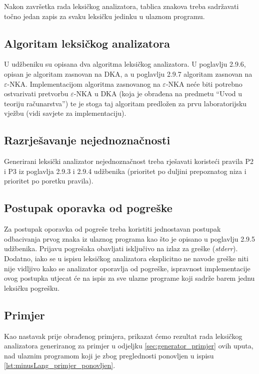 \documentclass[times, 12pt, utf8]{book}
\begin{document}
Nakon završetka rada leksičkog analizatora, tablica znakova treba sadržavati točno jedan zapis za svaku leksičku jedinku u ulaznom programu.

\subsection{Algoritam leksičkog analizatora}
U udžbeniku su opisana dva algoritma leksičkog analizatora.
U poglavlju 2.9.6, opisan je algoritam zasnovan na DKA, a u poglavlju 2.9.7 algoritam zasnovan na \(\varepsilon\)-NKA.
Implementacijom algoritma zasnovanog na \(\varepsilon\)-NKA neće biti potrebno ostvarivati pretvorbu \(\varepsilon\)-NKA u DKA (koja je obrađena na predmetu “Uvod u teoriju računarstva”) te je stoga taj algoritam predložen za prvu laboratorijsku vježbu (vidi savjete za implementaciju).

\subsection{Razrješavanje nejednoznačnosti}
Generirani leksički analizator nejednoznačnost treba rješavati koristeći pravila P2 i P3 iz poglavlja 2.9.3 i 2.9.4 udžbenika (prioritet po duljini prepoznatog niza i prioritet po poretku pravila).

\subsection{Postupak oporavka od pogreške}
Za postupak oporavka od pogreše treba koristiti jednostavan postupak odbacivanja prvog znaka iz ulaznog programa kao što je opisano u poglavlju 2.9.5 udžbenika.
Prijavu pogrešaka obavljati isključivo na izlaz za greške (\emph{stderr}).
Dodatno, iako se u ispisu leksičkog analizatora eksplicitno ne navode greške niti nije vidljivo kako se analizator oporavlja od pogreške, ispravnost implementacije ovog postupka utjecat će na ispis za sve ulazne programe koji sadrže barem jednu leksičku pogrešku.

\subsection{Primjer}\label{sec:leksicki_analizator_primjer}
Kao nastavak prije obrađenog primjera, prikazat ćemo rezultat rada leksičkog analizatora generiranog za primjer u odjeljku \ref{sec:generator_primjer} ovih uputa, nad ulaznim programom koji je zbog preglednosti ponovljen u ispisu \ref{lst:minusLang_primjer_ponovljen}.
\end{document}
